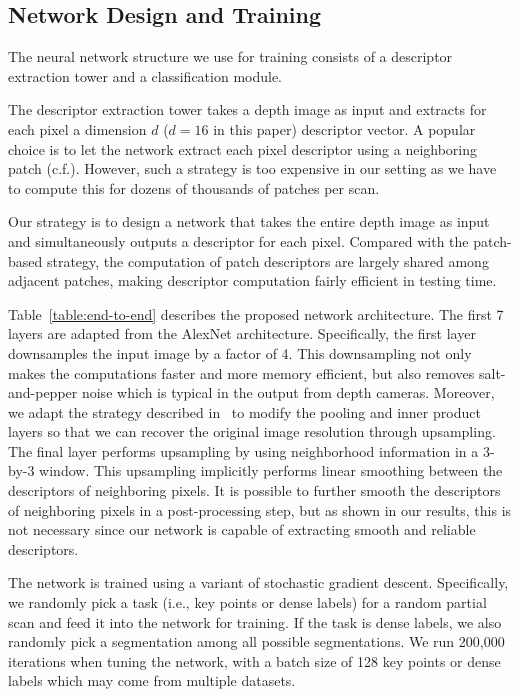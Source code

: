 \documentclass[10pt,twocolumn,letterpaper]{article}
\begin{document}
\subsection{Network Design and Training}

The neural network structure we use for training consists of a descriptor extraction tower and a classification module.

 The descriptor extraction tower takes a depth image as input and extracts for each pixel a dimension $d$ ($d=16$ in this paper) descriptor vector. A popular choice is to let the network extract each pixel descriptor using a neighboring patch (c.f.\cite{Han_2015_CVPR,DBLP:conf/cvpr/ZagoruykoK15}). However, such a strategy is too expensive in our setting as we have to compute this for dozens of thousands of patches per scan.

Our strategy is to design a network that takes the entire depth image as input and simultaneously outputs a descriptor for each pixel. Compared with the patch-based strategy, the computation of patch descriptors are largely shared among adjacent patches, making descriptor computation fairly efficient in testing time.

Table~\ref{table:end-to-end} describes the proposed network architecture. The first 7 layers are adapted from the AlexNet architecture.  Specifically, the first layer downsamples the input image by a factor of 4. This downsampling not only makes the computations faster and more memory efficient, but also removes salt-and-pepper noise which is typical in the output from depth cameras. Moreover, we adapt the strategy described in~\cite{SermanetEZMFL13} to modify the pooling and inner product layers so that we can recover the original image resolution through upsampling. The final layer performs upsampling by using neighborhood information in a 3-by-3 window. This upsampling implicitly performs linear smoothing between the descriptors of neighboring pixels. It is possible to further smooth the descriptors of neighboring pixels in a post-processing step, but as shown in our results, this is not necessary since our network is capable of extracting smooth and reliable descriptors.


 The network is trained using a variant of stochastic gradient descent. Specifically, we randomly pick a task (i.e., key points or dense labels) for a random partial scan and feed it into the network for training. If the task is dense labels, we also randomly pick a segmentation among all possible segmentations. We run 200,000 iterations when tuning the network, with a batch size of 128 key points or dense labels which may come from multiple datasets.
\end{document}
